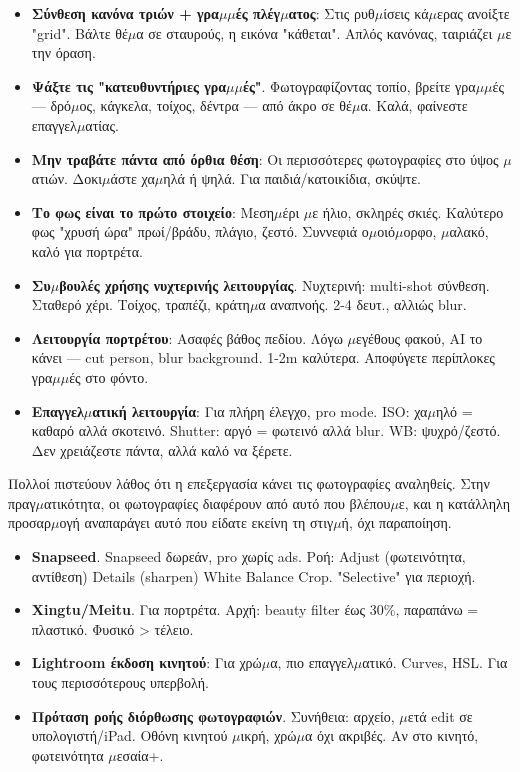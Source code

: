 \begin{itemize}
  \item \textbf{Σύνθεση κανόνα τριών + γρα$\mu$$\mu$ές πλέγ$\mu$ατος}: Στις ρυθ$\mu$ίσεις κά$\mu$ερας ανοίξτε "grid". Βάλτε θέ$\mu$α σε σταυρούς, η εικόνα "κάθεται". Απλός κανόνας, ταιριάζει $\mu$ε την όραση.
  \item \textbf{Ψάξτε τις "κατευθυντήριες γρα$\mu$$\mu$ές"}. Φωτογραφίζοντας τοπίο, βρείτε γρα$\mu$$\mu$ές — δρό$\mu$ος, κάγκελα, τοίχος, δέντρα — από άκρο σε θέ$\mu$α. Καλά, φαίνεστε επαγγελ$\mu$ατίας.
  \item \textbf{Μην τραβάτε πάντα από όρθια θέση}: Οι περισσότερες φωτογραφίες στο ύψος $\mu$ατιών. Δοκι$\mu$άστε χα$\mu$ηλά ή ψηλά. Για παιδιά/κατοικίδια, σκύψτε.
  \item \textbf{Το φως είναι το πρώτο στοιχείο}: Μεση$\mu$έρι $\mu$ε ήλιο, σκληρές σκιές. Καλύτερο φως "χρυσή ώρα" πρωί/βράδυ, πλάγιο, ζεστό. Συννεφιά ο$\mu$οιό$\mu$ορφο, $\mu$αλακό, καλό για πορτρέτα.
  \item \textbf{Συ$\mu$βουλές χρήσης νυχτερινής λειτουργίας}. Νυχτερινή: multi-shot σύνθεση. Σταθερό χέρι. Τοίχος, τραπέζι, κράτη$\mu$α αναπνοής. 2-4 δευτ., αλλιώς blur.
\end{itemize}


\begin{itemize}
  \item \textbf{Λειτουργία πορτρέτου}: Ασαφές βάθος πεδίου. Λόγω $\mu$εγέθους φακού, AI το κάνει — cut person, blur background. 1-2m καλύτερα. Αποφύγετε περίπλοκες γρα$\mu$$\mu$ές στο φόντο.
  \item \textbf{Επαγγελ$\mu$ατική λειτουργία}: Για πλήρη έλεγχο, pro mode. ISO: χα$\mu$ηλό = καθαρό αλλά σκοτεινό. Shutter: αργό = φωτεινό αλλά blur. WB: ψυχρό/ζεστό. Δεν χρειάζεστε πάντα, αλλά καλό να ξέρετε.
\end{itemize}


Πολλοί πιστεύουν λάθος ότι η επεξεργασία κάνει τις φωτογραφίες αναληθείς. Στην πραγ$\mu$ατικότητα, οι φωτογραφίες διαφέρουν από αυτό που βλέπου$\mu$ε, και η κατάλληλη προσαρ$\mu$ογή αναπαράγει αυτό που είδατε εκείνη τη στιγ$\mu$ή, όχι παραποίηση.

\begin{itemize}
  \item \textbf{Snapseed}. Snapseed δωρεάν, pro χωρίς ads. Ροή: Adjust (φωτεινότητα, αντίθεση) Details (sharpen) White Balance Crop. "Selective" για περιοχή.
  \item \textbf{Xingtu/Meitu}. Για πορτρέτα. Αρχή: beauty filter έως 30\%, παραπάνω = πλαστικό. Φυσικό > τέλειο.
  \item \textbf{Lightroom έκδοση κινητού}: Για χρώ$\mu$α, πιο επαγγελ$\mu$ατικό. Curves, HSL. Για τους περισσότερους υπερβολή.
  \item \textbf{Πρόταση ροής διόρθωσης φωτογραφιών}. Συνήθεια: αρχείο, $\mu$ετά edit σε υπολογιστή/iPad. Οθόνη κινητού $\mu$ικρή, χρώ$\mu$α όχι ακριβές. Αν στο κινητό, φωτεινότητα $\mu$εσαία+.
\end{itemize}

